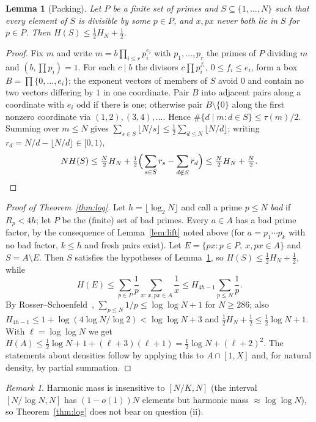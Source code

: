 \documentclass[11pt]{amsart}
\newtheorem{lemma}[theorem]{Lemma}
\theoremstyle{definition}
\theoremstyle{remark}
\newtheorem{remark}[theorem]{Remark}
\newcommand{\floor}[1]{\lfloor #1\rfloor}
\begin{document}
\begin{lemma}[Packing]\label{lem:packing}
Let $P$ be a finite set of primes and $S\subseteq\{1,\dots,N\}$ such that every element of $S$ is divisible by some $p\in P$, and $x,px$ never both lie in $S$ for $p\in P$. Then $H(S)\le\frac12H_N+\frac12$.
\end{lemma}
\begin{proof}
Fix $m$ and write $m=b\prod_{i\le r}p_i^{e_i}$ with $p_1,\dots,p_r$ the primes of $P$ dividing $m$ and $(b,\prod p_i)=1$. For each $c\mid b$ the divisors $c\prod p_i^{f_i}$, $0\le f_i\le e_i$, form a box $B=\prod\{0,\dots,e_i\}$; the exponent vectors of members of $S$ avoid $0$ and contain no two vectors differing by $1$ in one coordinate. Pair $B$ into adjacent pairs along a coordinate with $e_i$ odd if there is one; otherwise pair $B\setminus\{0\}$ along the first nonzero coordinate via $(1,2),(3,4),\dots$. Hence $\#\{d\mid m:d\in S\}\le\tau(m)/2$. Summing over $m\le N$ gives $\sum_{s\in S}\floor{N/s}\le\frac12\sum_{d\le N}\floor{N/d}$; writing $r_d=N/d-\floor{N/d}\in[0,1)$,
\[
N H(S)\le\tfrac N2H_N+\tfrac12\Big(\sum_{s\in S}r_s-\sum_{d\notin S}r_d\Big)\le\tfrac N2H_N+\tfrac N2 .\qedhere
\]
\end{proof}

\begin{proof}[Proof of Theorem~\ref{thm:log}]
Let $h=\floor{\log_2N}$ and call a prime $p\le N$ \emph{bad} if $R_p<4h$; let $P$ be the (finite) set of bad primes. Every $a\in A$ has a bad prime factor, by the consequence of Lemma~\ref{lem:lift} noted above (for $a=p_1\cdots p_k$ with no bad factor, $k\le h$ and fresh pairs exist). Let $E=\{px:p\in P,\ x,px\in A\}$ and $S=A\setminus E$. Then $S$ satisfies the hypotheses of Lemma~\ref{lem:packing}, so $H(S)\le\frac12H_N+\frac12$, while
\[
H(E)\le\sum_{p\in P}\frac1p\sum_{x:\,x,px\in A}\frac1x\le H_{4h-1}\sum_{p\le N}\frac1p .
\]
By Rosser--Schoenfeld~\cite[Thm.~5]{RS62}, $\sum_{p\le N}1/p\le\log\log N+1$ for $N\ge286$; also $H_{4h-1}\le1+\log(4\log N/\log2)<\log\log N+3$ and $\frac12H_N+\frac12\le\frac12\log N+1$. With $\ell=\log\log N$ we get $H(A)\le\frac12\log N+1+(\ell+3)(\ell+1)=\frac12\log N+(\ell+2)^2$. The statements about densities follow by applying this to $A\cap[1,X]$ and, for natural density, by partial summation.
\end{proof}

\begin{remark}
Harmonic mass is insensitive to $[N/K,N]$ (the interval $[N/\log N,N]$ has $(1-o(1))N$ elements but harmonic mass $\approx\log\log N$), so Theorem~\ref{thm:log} does not bear on question (ii).
\end{remark}
\end{document}
